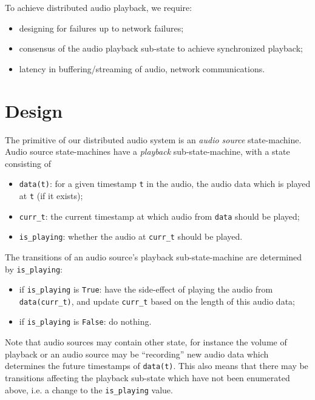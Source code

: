 \documentclass[%
               nonacm,sigconf,10pt]{acmart}
\newcommand{\py}[1]{\texttt{#1}}
\begin{document}
To achieve distributed audio playback, we require:

\begin{itemize}
    \item designing for failures up to network failures;
    \item consensus of the audio playback sub-state to achieve synchronized playback;
    \item latency in buffering/streaming of audio, network communications.
\end{itemize}

\section{Design}\label{sec:design}

The primitive of our distributed audio system is an {\it audio source} state-machine. Audio source state-machines have a {\it playback} sub-state-machine, with a state consisting of

\begin{itemize}
    \item \py{data(t)}: for a given timestamp \py{t} in the audio, the audio data which is played at \py{t} (if it exists);
    \item \py{curr_t}: the current timestamp at which audio from \py{data} should be played;
    \item \py{is_playing}: whether the audio at \py{curr_t} should be played.
\end{itemize}

The transitions of an audio source's playback sub-state-machine are determined by \py{is_playing}:

\begin{itemize}
    \item if \py{is_playing} is \py{True}: have the side-effect of playing the audio from \py{data(curr_t)}, and update \py{curr_t} based on the length of this audio data;
    \item if \py{is_playing} is \py{False}: do nothing.
\end{itemize}

Note that audio sources may contain other state, for instance the volume of playback or an audio source may be ``recording'' new audio data which determines the future timestamps of \py{data(t)}. This also means that there may be transitions affecting the playback sub-state which have not been enumerated above, i.e. a change to the \py{is_playing} value.
\end{document}
